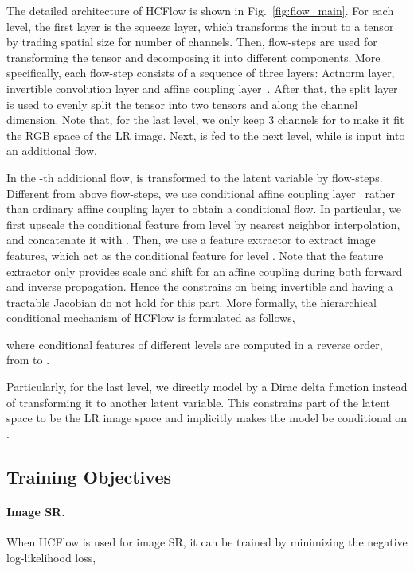 \documentclass[10pt,twocolumn,letterpaper]{article}
\begin{document}
The detailed architecture of HCFlow is shown in Fig.~\ref{fig:flow_main}. For each level, the first layer is the squeeze layer, which transforms the  input to a  tensor by trading spatial size for number of channels. Then,  flow-steps are used for transforming the tensor and decomposing it into different components. More specifically, each flow-step consists of a sequence of three layers: Actnorm layer, invertible  convolution layer and affine coupling layer~\cite{dinh2016realnvp, kingma2018glow}. After that, the split layer is used to evenly split the tensor into two tensors  and  along the channel dimension. Note that, for the last level, we only keep 3 channels for  to make it fit the RGB space of the LR image. Next,  is fed to the next level, while  is input into an additional flow.

In the -th additional flow,  is transformed to the latent variable  by  flow-steps. Different from above flow-steps, we use conditional affine coupling layer~\cite{ardizzone2019guided, winkler2019learning} rather than ordinary affine coupling layer to obtain a conditional flow. In particular, we first upscale the conditional feature  from level  by  nearest neighbor interpolation, and concatenate it with . Then, we use a feature extractor  to extract image features, which act as the conditional feature  for level .
Note that the feature extractor only provides scale and shift for an affine coupling during both forward and inverse propagation. Hence the constrains on being invertible and having a tractable Jacobian do not hold for this part.
More formally, the hierarchical conditional mechanism of HCFlow is formulated as follows,

where conditional features of different levels are computed in a reverse order, from  to .

Particularly, for the last level, we directly model  by a Dirac delta function  instead of transforming it to another latent variable. This constrains part of the latent space to be the LR image space and implicitly makes the model be conditional on .



\subsection{Training Objectives}
\paragraph{Image SR.} When HCFlow is used for image SR, it can be trained by minimizing the negative log-likelihood loss,
\end{document}
